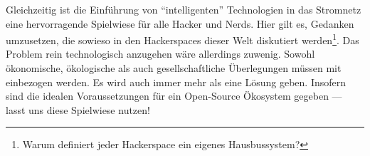 \documentclass[12pt,BCOR=8.5mm]{scrartcl}
\begin{document}
Gleichzeitig ist die Einführung von "`intelligenten"' Technologien in
das Stromnetz eine hervorragende Spielwiese für alle Hacker und Nerds.
Hier gilt es, Gedanken umzusetzen, die sowieso in den Hackerspaces
dieser Welt diskutiert werden\footnote{Warum definiert jeder Hackerspace
ein eigenes Hausbussystem?}. Das Problem rein technologisch anzugehen
wäre allerdings zuwenig. Sowohl ökonomische, ökologische als auch
gesellschaftliche Überlegungen müssen mit einbezogen werden. Es wird
auch immer mehr als eine Lösung geben. Insofern sind die idealen
Voraussetzungen für ein Open-Source Ökosystem gegeben --- lasst uns diese
Spielwiese nutzen!

\cite{geller2010smartgrid}


%
%
%
%
%
%


\end{document}
